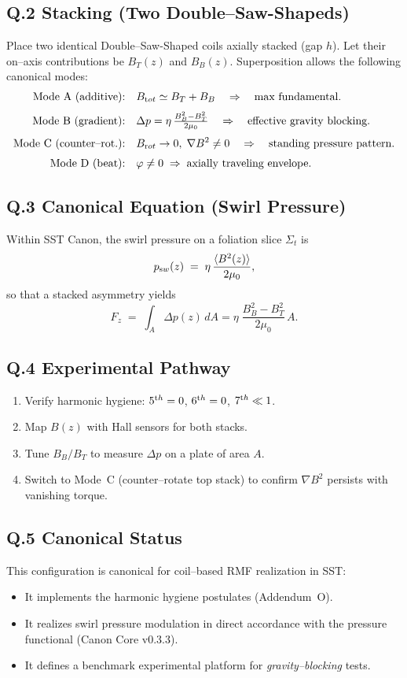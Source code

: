 \documentclass[10pt,reprint,aps,onecolumn,nofootinbib]{revtex4-2}
\begin{document}
\subsection*{Q.2 Stacking (Two Double--Saw-Shapeds)}
Place two identical Double--Saw-Shaped coils axially stacked (gap $h$).
Let their on--axis contributions be $B_T(z)$ and $B_B(z)$.
Superposition allows the following canonical modes:
\begin{align*}
	\text{Mode A (additive):}&\quad B_{\textrm tot}\simeq B_T+B_B
	\quad\Rightarrow\quad \text{max fundamental}.\\[3pt]
	\text{Mode B (gradient):}&\quad \Delta p = \eta\,\tfrac{B_B^2-B_T^2}{2\mu_0}
	\quad\Rightarrow\quad \text{effective gravity blocking}.\\[3pt]
	\text{Mode C (counter--rot.):}&\quad B_{\textrm rot}\to 0,\;
	\nabla B^2\neq 0
	\quad\Rightarrow\quad \text{standing pressure pattern}.\\[3pt]
	\text{Mode D (beat):}&\quad \varphi\neq 0\;\Rightarrow\;\text{axially traveling envelope}.
\end{align*}

\subsection*{Q.3 Canonical Equation (Swirl Pressure)}
Within SST Canon, the swirl pressure on a foliation slice $\Sigma_t$ is
\[
	p_{\textrm sw}(z) \;=\; \eta\,\frac{\langle B^2(z)\rangle}{2\mu_0},
\]
so that a stacked asymmetry yields
\[
	F_z \;=\; \int_A \Delta p(z)\,dA
	=\eta\;\frac{B_B^2-B_T^2}{2\mu_0}\,A.
\]

\subsection*{Q.4 Experimental Pathway}
\begin{enumerate}
	\item Verify harmonic hygiene: $5^{\textrm th}=0$, $6^{\textrm th}=0$, $7^{\textrm th}\ll1$.
	\item Map $B(z)$ with Hall sensors for both stacks.
	\item Tune $B_B/B_T$ to measure $\Delta p$ on a plate of area $A$.
	\item Switch to Mode~C (counter--rotate top stack) to confirm $\nabla B^2$ persists with vanishing torque.
\end{enumerate}

\subsection*{Q.5 Canonical Status}
This configuration is canonical for coil--based RMF realization in SST:
\begin{itemize}
	\item It implements the harmonic hygiene postulates (Addendum~O).
	\item It realizes swirl pressure modulation in direct accordance with the pressure functional (Canon Core v0.3.3).
	\item It defines a benchmark experimental platform for \emph{gravity--blocking} tests.
\end{itemize}
\end{document}
